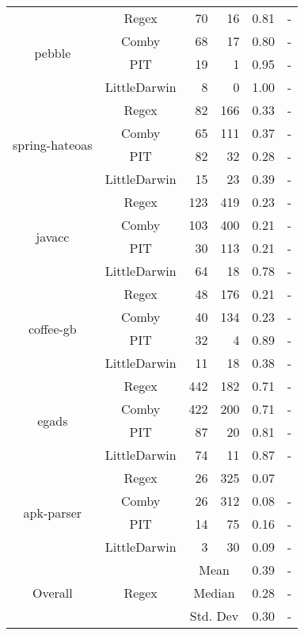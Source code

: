 \documentclass[sigconf,review, anonymous]{acmart}
\begin{document}
{\begin{table}[htbp]
{\begin{tabular}{|c|c|r|r|r|r|}
 \multirow{4}{*}{\small pebble} & Regex & 70 & 16 & 0.81 & - \\\cline{2-6}
    & Comby & 68 & 17 & 0.80 & - \\\cline{2-6}
    & PIT & 19 & 1 & 0.95 & - \\ \cline{2-6}
    & LittleDarwin & 8 & 0 & 1.00 & - \\ \hline
\multirow{4}{*}{\small spring-hateoas} & Regex & 82 & 166 & 0.33 & - \\\cline{2-6}
    & Comby & 65 & 111 & 0.37 & - \\ \cline{2-6}
    & PIT & 82 & 32 & 0.28 & - \\ \cline{2-6}
    & LittleDarwin & 15 & 23 & 0.39 & - \\ \hline
\multirow{4}{*}{\small javacc} & Regex & 123 & 419 & 0.23 & - \\\cline{2-6}
    & Comby & 103 & 400 & 0.21 & - \\ \cline{2-6}
    & PIT & 30 & 113 & 0.21 & -\\ \cline{2-6}
    & LittleDarwin & 64 & 18 & 0.78 & - \\ \hline
\multirow{4}{*}{\small coffee-gb} & Regex & 48 & 176 & 0.21 & - \\\cline{2-6}
    & Comby & 40 & 134 & 0.23 & - \\ \cline{2-6}
    & PIT & 32 & 4 & 0.89 & - \\ \cline{2-6}
    & LittleDarwin & 11 & 18 & 0.38 & -\\ \hline
\multirow{4}{*}{\small egads} & Regex & 442 & 182 & 0.71 & - \\\cline{2-6}
    & Comby & 422 & 200 & 0.71 & - \\ \cline{2-6}
    & PIT & 87 & 20 & 0.81 & - \\ \cline{2-6}
    & LittleDarwin & 74 & 11 & 0.87 & - \\ \hline
\multirow{4}{*}{\small apk-parser} & Regex & 26 & 325 & 0.07 & \\\cline{2-6}
    & Comby & 26 & 312 & 0.08 & -\\ \cline{2-6}
    & PIT & 14 & 75  & 0.16 & -\\ \cline{2-6}
    & LittleDarwin & 3 & 30 & 0.09 & -\\ \hline
    
\multirow{12}{*}{Overall} & \multirow{3}{*}{Regex} & \multicolumn{2}{c|}{Mean} & 0.39  & -\\\cline{3-6}
    &   &  \multicolumn{2}{c|}{Median} & 0.28 & - \\\cline{3-6}
    &   &  \multicolumn{2}{c|}{Std. Dev} & 0.30 & - \\\cline{2-6}


\end{tabular}}
\end{table}}
\end{document}
